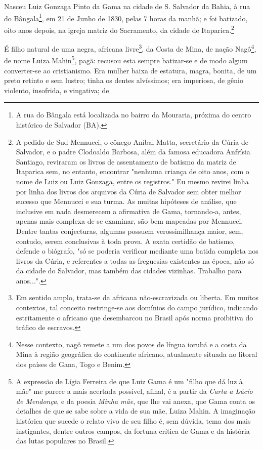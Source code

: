 Nasceu Luiz Gonzaga Pinto da Gama na cidade de S. Salvador da Bahia, à
rua do Bângala\footnote{A rua do Bângala está localizada no bairro da
  Mouraria, próxima do centro histórico de Salvador (BA).}, em 21 de
Junho de 1830, pelas 7 horas da manhã; e foi batizado, oito anos depois,
na igreja matriz do Sacramento, da cidade de Itaparica.\footnote{A
  pedido de Sud Mennucci, o cônego Aníbal Matta, secretário da Cúria de
  Salvador, e o padre Clodoaldo Barbosa, além da famosa educadora
  Anfrísia Santiago, reviraram os livros de assentamento de batismo da
  matriz de Itaparica sem, no entanto, encontrar "nenhuma criança de
  oito anos, com o nome de Luiz ou Luiz Gonzaga, entre os registros." Eu
  mesmo revirei linha por linha dos livros dos arquivos da Cúria de
  Salvador sem obter melhor sucesso que Mennucci e sua turma. As muitas
  hipóteses de análise, que inclusive em nada desmerecem a afirmativa de
  Gama, tornando-a, antes, apenas mais complexa de se examinar, são bem
  mapeadas por Mennucci. Dentre tantas conjecturas, algumas possuem
  verossimilhança maior, sem, contudo, serem conclusivas à toda prova. A
  exata certidão de batismo, defende o biógrafo, "só se poderia
  verificar mediante uma batida completa nos livros da Cúria, e
  referentes a todas as freguesias existentes na época, não só da cidade
  do Salvador, mas também das cidades vizinhas. Trabalho para anos...".}

É filho natural de uma negra, africana livre\footnote{Em sentido
  amplo, trata-se da africana não-escravizada ou liberta. Em muitos
  contextos, tal conceito restringe-se aos domínios do campo jurídico,
  indicando estritamente o africano que desembarcou no Brasil após norma
  proibitiva do tráfico de escravos.}, da Costa de Mina, de nação
Nagô\footnote{Nesse contexto, nagô remete a um dos povos de língua
  iorubá e a costa da Mina à região geográfica do continente africano,
  atualmente situada no litoral dos países de Gana, Togo e Benim.}, de
nome Luiza Mahin\footnote{A expressão de Lígia Ferreira de que Luiz
  Gama é um "filho que dá luz à mãe" me parece a mais acertada possível,
  afinal, é a partir da \emph{Carta a Lúcio de Mendonça}, e da poesia
  \emph{Minha mãe}, que lhe vai anexa, que Gama conta os detalhes de que
  se sabe sobre a vida de sua mãe, Luiza Mahin. A imaginação histórica
  que sucede o relato vivo de seu filho é, sem dúvida, tema dos mais
  instigantes, dentre outros campos, da fortuna crítica de Gama e da
  história das lutas populares no Brasil.}, pagã: recusou esta sempre
batizar-se e de modo algum converter-se ao cristianismo. Era mulher
baixa de estatura, magra, bonita, de um preto retinto e sem lustro;
tinha os dentes alvíssimos; era imperiosa, de gênio violento, insofrida,
e vingativa; de

